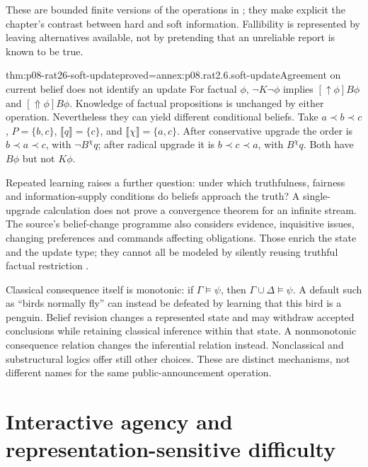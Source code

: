 These are bounded finite versions of the operations in
\cite[pp.~257--261]{BaltagSmets2011TruthUpgrades}; they make explicit
the chapter's contrast between hard and soft information. Fallibility
is represented by leaving alternatives available, not by pretending
that an unreliable report is known to be true.

\begin{hbtheorem}{thm:p08-rat26-soft-update}{proved=annex:p08.rat2.6.soft-update}{Agreement on current belief does not identify an update}
For factual \(\phi\), \(\neg K\neg\phi\) implies
\([\uparrow\phi]B\phi\) and \([\Uparrow\phi]B\phi\).
Knowledge of factual propositions is unchanged by either operation.
Nevertheless they can yield different conditional beliefs. Take
\(a\prec b\prec c\), \(P=\{b,c\}\),
\(\llbracket q\rrbracket=\{c\}\), and
\(\llbracket\chi\rrbracket=\{a,c\}\). After conservative upgrade
the order is \(b\prec a\prec c\), with \(\neg B^\chi q\);
after radical upgrade it is \(b\prec c\prec a\), with \(B^\chi q\).
Both have \(B\phi\) but not \(K\phi\).
\end{hbtheorem}

Repeated learning raises a further question: under which truthfulness,
fairness and information-supply conditions do beliefs approach the
truth? A single-upgrade calculation does not prove a convergence theorem
for an infinite stream. The source's belief-change programme also
considers evidence, inquisitive issues, changing preferences and
commands affecting obligations. Those enrich the state and the update
type; they cannot all be modeled by silently reusing truthful factual
restriction \cite[pp.~189--190]{VanBenthemLiuSmets2021Logico}.

Classical consequence itself is monotonic: if \(\Gamma\models\psi\),
then \(\Gamma\cup\Delta\models\psi\). A default such as ``birds
normally fly'' can instead be defeated by learning that this bird is a
penguin. Belief revision changes a represented state and may withdraw
accepted conclusions while retaining classical inference within that
state. A nonmonotonic consequence relation changes the inferential
relation instead. Nonclassical and substructural logics offer still
other choices. These are distinct mechanisms, not different names for
the same public-announcement operation.

\section{Interactive agency and representation-sensitive difficulty}

